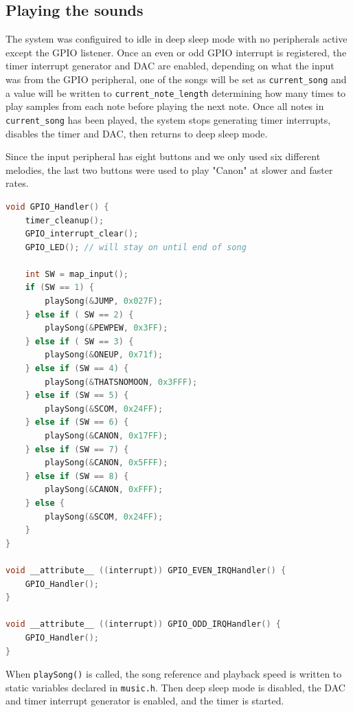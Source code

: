 \subsection{Playing the sounds}
The system was configuired to idle in deep sleep mode with no peripherals active except the GPIO listener. Once an even or odd GPIO interrupt is registered, the timer interrupt generator and DAC are enabled, depending on what the input was from the GPIO peripheral, one of the songs will be set as \texttt{current\_song} and a value will be written to \texttt{current\_note\_length} determining how many times to play samples from each note before playing the next note. Once all notes in \texttt{current\_song} has been played, the system stops generating timer interrupts, disables the timer and DAC, then returns to deep sleep mode.

Since the input peripheral has eight buttons and we only used six different melodies, the last two buttons were used to play "Canon" at slower and faster rates.

\begin{minipage}{\linewidth}
\begin{lstlisting}[language=C, label=interrupt_handlers, caption=GPIO handling from interrupt\_handlers.c]
void GPIO_Handler() {
    timer_cleanup();
    GPIO_interrupt_clear();
    GPIO_LED(); // will stay on until end of song

    int SW = map_input();
    if (SW == 1) {
        playSong(&JUMP, 0x027F);
    } else if ( SW == 2) {
        playSong(&PEWPEW, 0x3FF);
    } else if ( SW == 3) {
        playSong(&ONEUP, 0x71f);
    } else if (SW == 4) {
        playSong(&THATSNOMOON, 0x3FFF);
    } else if (SW == 5) {
        playSong(&SCOM, 0x24FF);
    } else if (SW == 6) {
        playSong(&CANON, 0x17FF);
    } else if (SW == 7) {
        playSong(&CANON, 0x5FFF);
    } else if (SW == 8) {
        playSong(&CANON, 0xFFF);
    } else {
        playSong(&SCOM, 0x24FF);
    }
}

void __attribute__ ((interrupt)) GPIO_EVEN_IRQHandler() { 
    GPIO_Handler();
}

void __attribute__ ((interrupt)) GPIO_ODD_IRQHandler() {
    GPIO_Handler();
}
\end{lstlisting}
\end{minipage}

When \texttt{playSong()} is called, the song reference and playback speed is written to static variables declared in \texttt{music.h}. Then deep sleep mode is disabled, the DAC and timer interrupt generator is enabled, and the timer is started.


